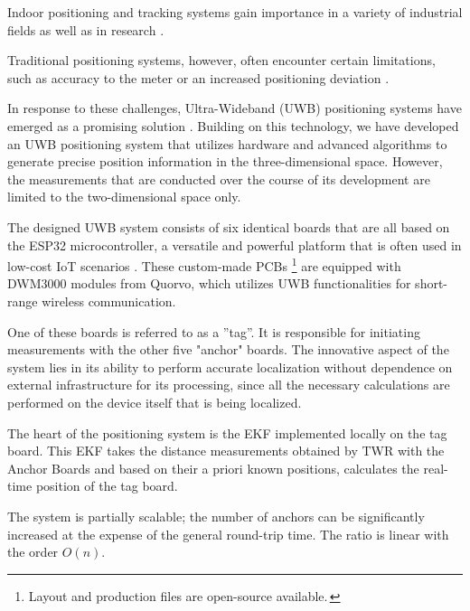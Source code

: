 \documentclass[conference, a4paper]{IEEEtran}
\begin{document}
Indoor positioning and tracking systems gain importance in a variety of industrial fields as well as in research \cite{LiFi_Positioning} \cite{Accelerometer_Positioning} \cite{UWB_Positioning} \cite{UWB_Positioning2}.

Traditional positioning systems, however, often encounter certain limitations, such as accuracy to the meter \cite{LiFi_Positioning} or an increased positioning deviation \cite{Accelerometer_Positioning}. 

In response to these challenges, Ultra-Wideband (UWB) positioning systems have emerged as a promising solution \cite{UWB_Positioning} \cite{UWB_Positioning2}.
Building on this technology, we have developed an \ac{UWB} positioning system that utilizes hardware and advanced algorithms to generate precise position information in the three-dimensional space. However, the measurements that are conducted over the course of its development are limited to the two-dimensional space only. 

The designed \ac{UWB} system consists of six identical boards that are all based on the ESP32 microcontroller, a versatile and powerful platform that is often used in low-cost \ac{IoT} scenarios \cite{ESP32}. 
These custom-made \acp{PCB} \footnote{Layout and production files are open-source available.\,\cite{uwb-tracking}} are equipped with DWM3000 modules from Quorvo, which utilizes \ac{UWB} functionalities for short-range wireless communication.

One of these boards is referred to as a ''tag''.
It is responsible for initiating measurements with the other five "anchor" boards.
The innovative aspect of the system lies in its ability to perform accurate localization without dependence on external infrastructure for its processing,
since all the necessary calculations are performed on the device itself that is being localized.

The heart of the positioning system is the \acf{EKF} implemented locally on the tag board.
This \ac{EKF} takes the distance measurements obtained by \acf{TWR} with the Anchor Boards
and based on their a priori known positions, calculates the real-time position of the tag board.

The system is partially scalable; the number of anchors can be significantly increased at
the expense of the general round-trip time. The ratio is linear with the order $O(n)$.
\end{document}
